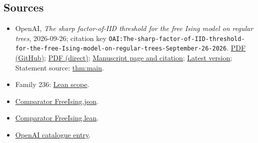 \documentclass[11pt]{article}
\begin{document}
\subsection{Sources}
\begin{itemize}
\item OpenAI, \emph{The sharp factor-of-IID threshold for the free Ising model on regular trees}, 2026-09-26; citation key \texttt{OAI:The-sharp-factor-of-IID-threshold-for-the-free-Ising-model-on-regular-trees-September-26-2026}. \href{https://github.com/openai/math/blob/adc7f1241b42e322a6451854ab7e4b4c146bf78a/preprints/The-sharp-factor-of-IID-threshold-for-the-free-Ising-model-on-regular-trees-September-26-2026/article.pdf}{PDF (GitHub)}; \href{https://github.com/openai/math/raw/adc7f1241b42e322a6451854ab7e4b4c146bf78a/preprints/The-sharp-factor-of-IID-threshold-for-the-free-Ising-model-on-regular-trees-September-26-2026/article.pdf}{PDF (direct)}; \href{https://github.com/openai/math/blob/adc7f1241b42e322a6451854ab7e4b4c146bf78a/preprints/The-sharp-factor-of-IID-threshold-for-the-free-Ising-model-on-regular-trees-September-26-2026/README.md}{Manuscript page and citation}; \href{https://github.com/openai/math/blob/main/preprints/The-sharp-factor-of-IID-threshold-for-the-free-Ising-model-on-regular-trees-September-26-2026/article.pdf}{Latest version}; Statement source: \href{https://github.com/openai/math/blob/adc7f1241b42e322a6451854ab7e4b4c146bf78a/preprints/The-sharp-factor-of-IID-threshold-for-the-free-Ising-model-on-regular-trees-September-26-2026/build/sections/01-introduction.tex\#L38}{thm:main}.
\item Family 236: \href{https://github.com/openai/math/blob/adc7f1241b42e322a6451854ab7e4b4c146bf78a/lean/docs/236.md}{Lean scope}.
\item \href{https://github.com/openai/math/blob/adc7f1241b42e322a6451854ab7e4b4c146bf78a/lean/ComparatorChallenges/FreeIsing.json}{Comparator FreeIsing.json}.
\item \href{https://github.com/openai/math/blob/adc7f1241b42e322a6451854ab7e4b4c146bf78a/lean/ComparatorChallenges/FreeIsing.lean}{Comparator FreeIsing.lean}.
\item \href{https://github.com/openai/math/blob/adc7f1241b42e322a6451854ab7e4b4c146bf78a/CONTENTS.md}{OpenAI catalogue entry}.
\end{itemize}
\end{document}
